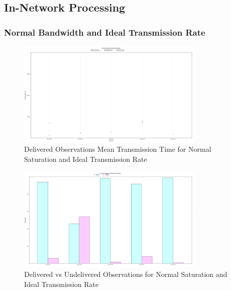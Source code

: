 \subsection{In-Network Processing}

\subsubsection{Normal Bandwidth and Ideal Transmission Rate}
	\begin{figure}[H]
	\centering
	\includegraphics[width=0.8\textwidth]{Chap7/figures/plots/normal_ideal/delivered_mean.png}
	\caption{Delivered Observations Mean Transmission Time for Normal Saturation and Ideal Transmission Rate}
	\label{fig:sim:res:norm:ideal:delmean}
	\end{figure}

	\begin{figure}[H]
	\centering
	\includegraphics[width=0.8\textwidth]{Chap7/figures/plots/normal_ideal/delvsundel_percent.png}
	\caption{Delivered vs Undelivered Observations for Normal Saturation and Ideal Transmission Rate}
	\label{fig:sim:res:norm:ideal:delundel}
	\end{figure}

